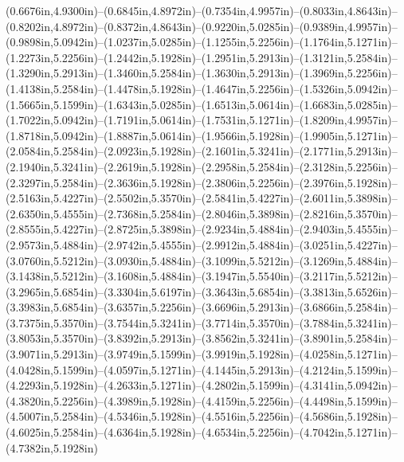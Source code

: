 (0.6676in,4.9300in)--(0.6845in,4.8972in)--(0.7354in,4.9957in)--(0.8033in,4.8643in)--(0.8202in,4.8972in)--(0.8372in,4.8643in)--(0.9220in,5.0285in)--(0.9389in,4.9957in)--(0.9898in,5.0942in)--(1.0237in,5.0285in)--(1.1255in,5.2256in)--(1.1764in,5.1271in)--(1.2273in,5.2256in)--(1.2442in,5.1928in)--(1.2951in,5.2913in)--(1.3121in,5.2584in)--(1.3290in,5.2913in)--(1.3460in,5.2584in)--(1.3630in,5.2913in)--(1.3969in,5.2256in)--(1.4138in,5.2584in)--(1.4478in,5.1928in)--(1.4647in,5.2256in)--(1.5326in,5.0942in)--(1.5665in,5.1599in)--(1.6343in,5.0285in)--(1.6513in,5.0614in)--(1.6683in,5.0285in)--(1.7022in,5.0942in)--(1.7191in,5.0614in)--(1.7531in,5.1271in)--(1.8209in,4.9957in)--(1.8718in,5.0942in)--(1.8887in,5.0614in)--(1.9566in,5.1928in)--(1.9905in,5.1271in)--(2.0584in,5.2584in)--(2.0923in,5.1928in)--(2.1601in,5.3241in)--(2.1771in,5.2913in)--(2.1940in,5.3241in)--(2.2619in,5.1928in)--(2.2958in,5.2584in)--(2.3128in,5.2256in)--(2.3297in,5.2584in)--(2.3636in,5.1928in)--(2.3806in,5.2256in)--(2.3976in,5.1928in)--(2.5163in,5.4227in)--(2.5502in,5.3570in)--(2.5841in,5.4227in)--(2.6011in,5.3898in)--(2.6350in,5.4555in)--(2.7368in,5.2584in)--(2.8046in,5.3898in)--(2.8216in,5.3570in)--(2.8555in,5.4227in)--(2.8725in,5.3898in)--(2.9234in,5.4884in)--(2.9403in,5.4555in)--(2.9573in,5.4884in)--(2.9742in,5.4555in)--(2.9912in,5.4884in)--(3.0251in,5.4227in)--(3.0760in,5.5212in)--(3.0930in,5.4884in)--(3.1099in,5.5212in)--(3.1269in,5.4884in)--(3.1438in,5.5212in)--(3.1608in,5.4884in)--(3.1947in,5.5540in)--(3.2117in,5.5212in)--(3.2965in,5.6854in)--(3.3304in,5.6197in)--(3.3643in,5.6854in)--(3.3813in,5.6526in)--(3.3983in,5.6854in)--(3.6357in,5.2256in)--(3.6696in,5.2913in)--(3.6866in,5.2584in)--(3.7375in,5.3570in)--(3.7544in,5.3241in)--(3.7714in,5.3570in)--(3.7884in,5.3241in)--(3.8053in,5.3570in)--(3.8392in,5.2913in)--(3.8562in,5.3241in)--(3.8901in,5.2584in)--(3.9071in,5.2913in)--(3.9749in,5.1599in)--(3.9919in,5.1928in)--(4.0258in,5.1271in)--(4.0428in,5.1599in)--(4.0597in,5.1271in)--(4.1445in,5.2913in)--(4.2124in,5.1599in)--(4.2293in,5.1928in)--(4.2633in,5.1271in)--(4.2802in,5.1599in)--(4.3141in,5.0942in)--(4.3820in,5.2256in)--(4.3989in,5.1928in)--(4.4159in,5.2256in)--(4.4498in,5.1599in)--(4.5007in,5.2584in)--(4.5346in,5.1928in)--(4.5516in,5.2256in)--(4.5686in,5.1928in)--(4.6025in,5.2584in)--(4.6364in,5.1928in)--(4.6534in,5.2256in)--(4.7042in,5.1271in)--(4.7382in,5.1928in)
